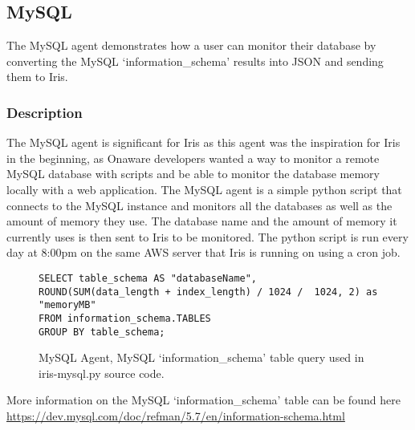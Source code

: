 \documentclass[12pt,a4paper,titlepage]{report}
\begin{document}
\subsection{MySQL}
The MySQL agent demonstrates how a user can monitor their database by converting the MySQL `information\_schema' results into JSON and sending them to Iris.
\subsubsection{Description}
The MySQL agent is significant for Iris as this agent was the inspiration for Iris in the beginning, as Onaware developers wanted a way to monitor a remote MySQL database with scripts and be able to monitor the database memory locally with a web application. The MySQL agent is a simple python script that connects to the MySQL instance and monitors all the databases as well as the amount of memory they use. The database name and the amount of memory it currently uses is then sent to Iris to be monitored. The python script is run every day at 8:00pm on the same AWS server that Iris is running on using a cron job.

\begin{figure}[H]
\begin{tcolorbox}
\begin{verbatim}
SELECT table_schema AS "databaseName", 
ROUND(SUM(data_length + index_length) / 1024 /  1024, 2) as "memoryMB" 
FROM information_schema.TABLES 
GROUP BY table_schema;
\end{verbatim}
\end{tcolorbox}
\caption{MySQL Agent, MySQL `information\_schema' table query used in iris-mysql.py source code.}
\end{figure}

More information on the MySQL `information\_schema' table can be found here \url{https://dev.mysql.com/doc/refman/5.7/en/information-schema.html}
\end{document}
